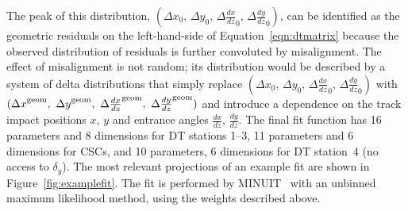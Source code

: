 The peak of this distribution, $({\Delta x}_0, \, {\Delta y}_0,
\, {\Delta \frac{dx}{dz}}_0, \, {\Delta\frac{dy}{dz}}_0)$, can be
identified as the geometric residuals on the left-hand-side of
Equation~\ref{eqn:dtmatrix} because the observed distribution of
residuals is further convoluted by misalignment.  The effect of
misalignment is not random; its distribution would be described by a
system of delta distributions that simply replace $({\Delta x}_0, \, {\Delta y}_0,
\, {\Delta \frac{dx}{dz}}_0, \, {\Delta\frac{dy}{dz}}_0)$ with 
$({\Delta x}^{\mbox{\scriptsize geom}},\mbox{ }{\Delta
y}^{\mbox{\scriptsize geom}},\mbox{
}{\Delta \frac{dx}{dz}}^{\mbox{\scriptsize geom}},\mbox{
}{\Delta \frac{dy}{dz}}^{\mbox{\scriptsize geom}})$ and introduce a
dependence on the track impact positions $x$, $y$ and entrance angles
$\tfrac{dx}{dz}$, $\tfrac{dy}{dz}$.  The final fit function has 16
parameters and 8 dimensions for DT stations 1--3, 11 parameters and 6
dimensions for CSCs, and 10 parameters, 6 dimensions for DT station~4
(no access to $\delta_y$).  The most relevant projections of an
example fit are shown in Figure~\ref{fig:examplefit}.  The fit is
performed by MINUIT~\cite{ref:minuit} with an unbinned maximum
likelihood method, using the weights described above.

